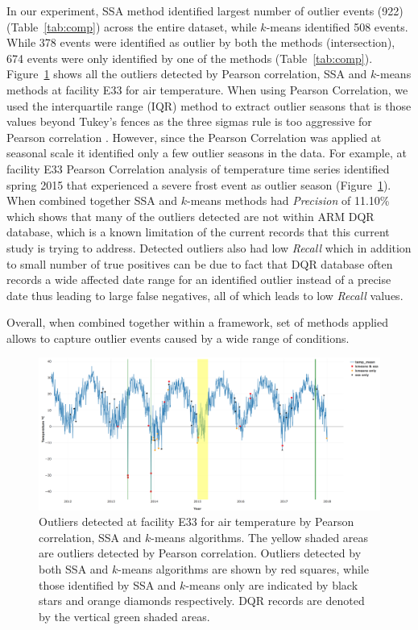 In our experiment, SSA method identified largest number of outlier events (922)
(Table~\ref{tab:comp}) across the entire dataset, while $k$-means
identified 508 events. While 378 events were identified as outlier by
both the methods (intersection), 674 events were only identified by one
of the methods (Table~\ref{tab:comp}).
Figure~\ref{fig:combined} shows all the outliers detected by Pearson correlation, SSA and
$k$-means methods at facility E33 for air temperature. 
When using Pearson Correlation, we used 
the interquartile range (IQR) method to extract outlier seasons that 
is those values beyond Tukey's fences as the three sigmas rule is too 
aggressive for Pearson correlation \cite{tukey1977exploratory}. 
However, since the Pearson Correlation was applied at seasonal scale it
identified only a few outlier seasons in the data. For example, at
facility E33 Pearson Correlation analysis of temperature time series
identified spring 2015 that experienced a severe frost event as outlier
season (Figure~\ref{fig:combined}).
When combined together SSA and $k$-means methods had \textit{Precision} of 
11.10\% which shows that many of the outliers
detected are not within ARM DQR database, which is a known limitation of
the current records that this current study is trying to address.
Detected outliers also had low \textit{Recall} which in addition to small
number of true positives can be due to fact that DQR database often
records a wide affected date range for an identified outlier instead of a
precise date thus leading to large false negatives, all of which leads
to low \textit{Recall} values.

Overall, when combined together within a framework, set of methods applied allows
to capture outlier events caused by a wide range of conditions. 

\begin{figure}[ht]
    \centering
    \includegraphics[width=\textwidth]{figures/combined.png}
    \caption{Outliers detected at facility E33 for air temperature
		by Pearson correlation, SSA and $k$-means algorithms. The yellow shaded areas are
		outliers detected by Pearson correlation. Outliers detected by both SSA and $k$-means
		algorithms are shown by red squares, while those identified by
		SSA and $k$-means only are indicated by black stars and orange
		diamonds respectively. DQR records are denoted by the vertical green shaded areas.}
    \label{fig:combined}
\end{figure}
